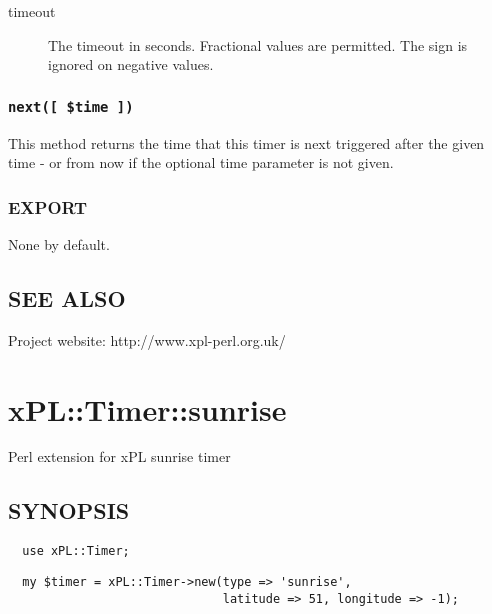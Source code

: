 \documentclass[12pt,a4paper]{article}
\begin{document}
\begin{description}

\item[{timeout}] \mbox{}

The timeout in seconds.  Fractional values are permitted.  The sign is
ignored on negative values.

\end{description}
\subsubsection*{\texttt{next([ \$time ])}\label{xPL::Timer::simple_next_time_}}


This method returns the time that this timer is next triggered after
the given time - or from now if the optional time parameter is not
given.

\subsubsection*{EXPORT\label{xPL::Timer::simple_EXPORT}}


None by default.

\subsection*{SEE ALSO\label{xPL::Timer::simple_SEE_ALSO}}


Project website: http://www.xpl-perl.org.uk/

\newpage
\section{xPL::Timer::sunrise\label{xPL::Timer::sunrise}}


Perl extension for xPL sunrise timer

\subsection*{SYNOPSIS\label{xPL::Timer::sunrise_SYNOPSIS}}
\begin{verbatim}
  use xPL::Timer;
\end{verbatim}
\begin{verbatim}
  my $timer = xPL::Timer->new(type => 'sunrise',
                              latitude => 51, longitude => -1);
\end{verbatim}
\end{document}
